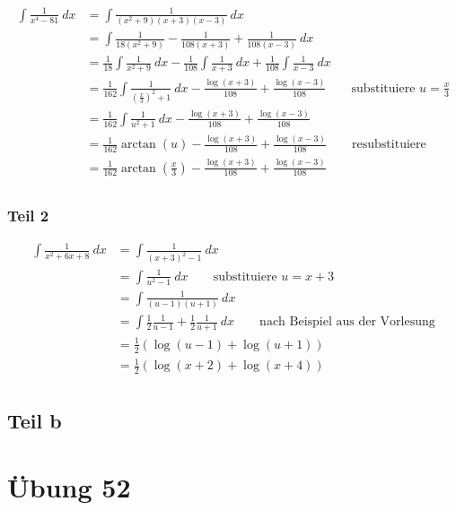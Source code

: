 \documentclass[a4paper,10pt]{article}
\begin{document}
\begin{align*}
 \int \frac{1}{x^4 - 81}\ dx & = \int \frac{1}{(x^2 + 9)(x + 3)(x - 3)}\ dx\\
 & = \int \frac{1}{18(x^2 + 9)} - \frac{1}{108(x + 3)} + \frac{1}{108(x - 3)}\ dx\\
 & = \frac{1}{18} \int \frac{1}{x^2 + 9}\ dx - \frac{1}{108} \int \frac{1}{x + 3}\ dx + \frac{1}{108} \int \frac{1}{x - 3}\ dx\\
 & = \frac{1}{162} \int \frac{1}{(\frac{x}{3})^2 + 1}\ dx - \frac{\log(x + 3)}{108} + \frac{\log(x - 3)}{108} \qquad \text{substituiere $u = \frac{x}{3}$}\\
 & = \frac{1}{162} \int \frac{1}{u^2 + 1}\ dx - \frac{\log(x + 3)}{108} + \frac{\log(x - 3)}{108}\\
 & = \frac{1}{162} \arctan(u) - \frac{\log(x + 3)}{108} + \frac{\log(x - 3)}{108} \qquad \text{resubstituiere}\\
 & = \frac{1}{162} \arctan(\frac{x}{3}) - \frac{\log(x + 3)}{108} + \frac{\log(x - 3)}{108}\\
\end{align*}

\subsubsection*{Teil 2}

\begin{align*}
 \int \frac{1}{x^2 + 6x + 8}\ dx & = \int \frac{1}{(x + 3)^2 - 1}\ dx\\
 & = \int \frac{1}{u^2 - 1}\ dx \qquad \text{substituiere $u = x + 3$}\\
 & = \int \frac{1}{(u - 1)(u + 1)}\ dx\\
 & = \int \frac{1}{2}\frac{1}{u - 1} + \frac{1}{2}\frac{1}{u + 1}\ dx \qquad \text{nach Beispiel aus der Vorlesung}\\
 & = \frac{1}{2} \left( \log(u - 1) + \log(u + 1) \right)\\
 & = \frac{1}{2} \left( \log(x + 2) + \log(x + 4) \right)\\
\end{align*}

\subsection*{Teil b}

\section*{Übung 52}
\end{document}
